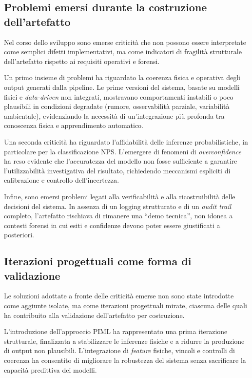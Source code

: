 \subsection{Problemi emersi durante la costruzione dell’artefatto}
\label{sec:exp_problems}

Nel corso dello sviluppo sono emerse criticità che non possono essere interpretate come semplici difetti implementativi, ma come indicatori di fragilità strutturale dell’artefatto rispetto ai requisiti operativi e forensi.

Un primo insieme di problemi ha riguardato la coerenza fisica e operativa degli output generati dalla pipeline. Le prime versioni del sistema, basate su modelli fisici e \textit{data-driven} non integrati, mostravano comportamenti instabili o poco plausibili in condizioni degradate (rumore, osservabilità parziale, variabilità ambientale), evidenziando la necessità di un’integrazione più profonda tra conoscenza fisica e apprendimento automatico.

Una seconda criticità ha riguardato l’affidabilità delle inferenze probabilistiche, in particolare per la classificazione NPS. L’emergere di fenomeni di \emph{overconfidence} ha reso evidente che l’accuratezza del modello non fosse sufficiente a garantire l’utilizzabilità investigativa del risultato, richiedendo meccanismi espliciti di calibrazione e controllo dell’incertezza.

Infine, sono emersi problemi legati alla verificabilità e alla ricostruibilità delle decisioni del sistema. In assenza di un logging strutturato e di un \textit{audit trail} completo, l’artefatto rischiava di rimanere una ``demo tecnica'', non idonea a contesti forensi in cui esiti e confidenze devono poter essere giustificati a posteriori.

\subsection{Iterazioni progettuali come forma di validazione}
\label{sec:exp_iterations}

Le soluzioni adottate a fronte delle criticità emerse non sono state introdotte come aggiunte isolate, ma come iterazioni progettuali mirate, ciascuna delle quali ha contribuito alla validazione dell’artefatto per costruzione.

L’introduzione dell’approccio PIML ha rappresentato una prima iterazione strutturale, finalizzata a stabilizzare le inferenze fisiche e a ridurre la produzione di output non plausibili. L’integrazione di \textit{feature} fisiche, vincoli e controlli di coerenza ha consentito di migliorare la robustezza del sistema senza sacrificare la capacità predittiva dei modelli.

